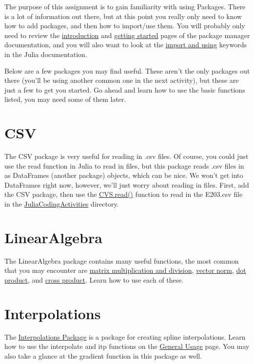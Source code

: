 \documentclass{article}%
\begin{document}
The purpose of this assignment is to gain familiarity with using Packages. There is a lot of information out there, but at this point you really only need to know how to add packages, and then how to import/use them. You will probably only need to review the \href{https://julialang.github.io/Pkg.jl/v1/}{introduction} and \href{https://julialang.github.io/Pkg.jl/v1/getting-started/}{getting started} pages of the package manager documentation, and you will also want to look at the \href{https://docs.julialang.org/en/v1/base/base/#import}{import and using} keywords in the Julia documentation.

Below are a few packages you may find useful. These aren't the only packages out there (you'll be using another common one in the next activity), but these are just a few to get you started. Go ahead and learn how to use the basic functions listed, you may need some of them later.

\section*{CSV}

The CSV package is very useful for reading in .csv files. Of course, you could just use the read function in Julia to read in files, but this package reads .csv files in as DataFrames (another package) objects, which can be nice. We won't get into DataFrames right now, however, we'll just worry about reading in files. First, add the CSV package, then use the \href{http://juliadata.github.io/CSV.jl/v0.1.1/index.html#CSV.read}{CVS.read()} function to read in the E203.csv file in the \href{https://github.com/byuflowlab/undergrad-onboarding/tree/master/1-activities/JuliaCodingActivities}{JuliaCodingActivities} directory.

\section*{LinearAlgebra}

The LinearAlgebra package contains many useful functions, the most common that you may encounter are \href{https://docs.julialang.org/en/v1/stdlib/LinearAlgebra/index.html#Standard-Functions-1}{matrix multiplication and division}, \href{https://docs.julialang.org/en/v1/stdlib/LinearAlgebra/index.html#LinearAlgebra.dot}{vector norm}, \href{https://docs.julialang.org/en/v1/stdlib/LinearAlgebra/index.html#LinearAlgebra.dot}{dot product}, and \href{https://docs.julialang.org/en/v1/stdlib/LinearAlgebra/index.html#LinearAlgebra.cross}{cross product}. Learn how to use each of these.

\section*{Interpolations}

The \href{http://juliamath.github.io/Interpolations.jl/latest/}{Interpolations Package} is a package for creating spline interpolations. Learn how to use the interpolate and itp functions on the \href{http://juliamath.github.io/Interpolations.jl/latest/interpolations/}{General Usage} page. You may also take a glance at the gradient function in this package as well.
\end{document}
